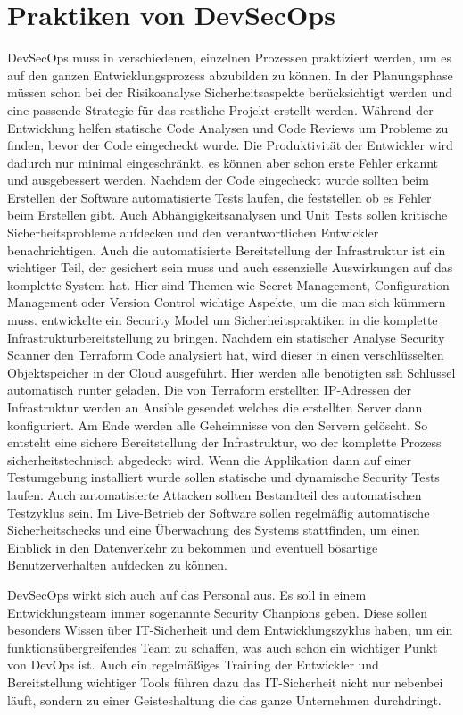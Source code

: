\section{Praktiken von DevSecOps}
DevSecOps muss in verschiedenen, einzelnen Prozessen praktiziert werden, um es auf den ganzen Entwicklungsprozess abzubilden zu können.
In der Planungsphase müssen schon bei der Risikoanalyse Sicherheitsaspekte berücksichtigt werden und eine passende Strategie für das restliche Projekt erstellt werden.
Während der Entwicklung helfen statische Code Analysen und Code Reviews um Probleme zu finden, bevor der Code eingecheckt wurde. Die Produktivität der Entwickler wird dadurch nur minimal eingeschränkt, es können aber schon erste Fehler erkannt und ausgebessert werden.
Nachdem der Code eingecheckt wurde sollten beim Erstellen der Software automatisierte Tests laufen, die feststellen ob es Fehler beim Erstellen gibt. Auch Abhängigkeitsanalysen und Unit Tests sollen kritische Sicherheitsprobleme aufdecken und den verantwortlichen Entwickler benachrichtigen.
Auch die automatisierte Bereitstellung der Infrastruktur ist ein wichtiger Teil, der gesichert sein muss und auch essenzielle Auswirkungen auf das komplette System hat.
Hier sind Themen wie Secret Management, Configuration Management oder Version Control wichtige Aspekte, um die man sich kümmern muss.\cite{grey}
\cite{security-model} entwickelte ein Security Model um Sicherheitspraktiken in die komplette Infrastrukturbereitstellung zu bringen. Nachdem ein statischer Analyse Security Scanner den Terraform Code analysiert hat, wird dieser in einen verschlüsselten Objektspeicher in der Cloud ausgeführt. Hier werden alle benötigten \ac{ssh} Schlüssel automatisch runter geladen. Die von Terraform erstellten IP-Adressen der Infrastruktur werden an Ansible gesendet welches die erstellten Server dann konfiguriert. Am Ende werden alle Geheimnisse von den Servern gelöscht. So entsteht eine sichere Bereitstellung der Infrastruktur, wo der komplette Prozess sicherheitstechnisch abgedeckt wird.
Wenn die Applikation dann auf einer Testumgebung installiert wurde sollen statische und dynamische Security Tests laufen. Auch automatisierte Attacken sollten Bestandteil des automatischen Testzyklus sein.
Im Live-Betrieb der Software sollen regelmäßig automatische Sicherheitschecks und eine Überwachung des Systems stattfinden, um einen Einblick in den Datenverkehr zu bekommen und eventuell bösartige Benutzerverhalten aufdecken zu können.

DevSecOps wirkt sich auch auf das Personal aus. Es soll in einem Entwicklungsteam immer sogenannte \glqq Security Chanpions\grqq \cite{grey} geben. Diese sollen besonders Wissen über IT-Sicherheit und dem Entwicklungszyklus haben, um ein funktionsübergreifendes Team zu schaffen, was auch schon ein wichtiger Punkt von DevOps ist.
Auch ein regelmäßiges Training der Entwickler und Bereitstellung wichtiger Tools führen dazu das IT-Sicherheit nicht nur nebenbei läuft, sondern zu einer Geisteshaltung die das ganze Unternehmen durchdringt.


